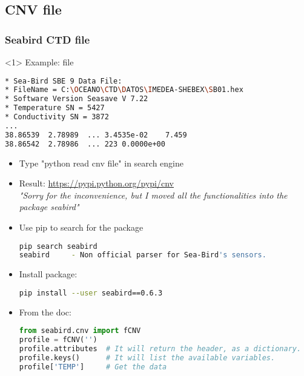 \subsection{CNV file}

\begin{frame}[fragile]
\frametitle{Seabird CTD file}

\begin{onlyenv}<1>
Example: file 

\begin{lstlisting}[language=bash,basicstyle=\tiny,title={Example of CNV file}]
* Sea-Bird SBE 9 Data File:
* FileName = C:\OCEANO\CTD\DATOS\IMEDEA-SHEBEX\SB01.hex
* Software Version Seasave V 7.22
* Temperature SN = 5427
* Conductivity SN = 3872
...
38.86539  2.78989  ... 3.4535e-02    7.459    
38.86542  2.78986  ... 223 0.0000e+00
\end{lstlisting}
\end{onlyenv}

\begin{itemize}
\item<2-6> Type "python read cnv file" in search engine
\item<3-6> Result: \url{https://pypi.python.org/pypi/cnv}\\
{\tiny\it "Sorry for the inconvenience, but I moved all the functionalities into the package seabird"}
\item<4-6> Use pip to search for the package
\begin{lstlisting}[language=bash,basicstyle=\tiny]
pip search seabird
seabird     - Non official parser for Sea-Bird's sensors.
\end{lstlisting}
\item<5-6> Install package:
\begin{lstlisting}[language=bash,basicstyle=\tiny]
pip install --user seabird==0.6.3
\end{lstlisting}
\item<6> From the doc:
\begin{lstlisting}[language=python,basicstyle=\tiny]
from seabird.cnv import fCNV
profile = fCNV('')
profile.attributes 	# It will return the header, as a dictionary.
profile.keys()		# It will list the available variables.
profile['TEMP']   	# Get the data
\end{lstlisting}
\end{itemize}

\end{frame}


